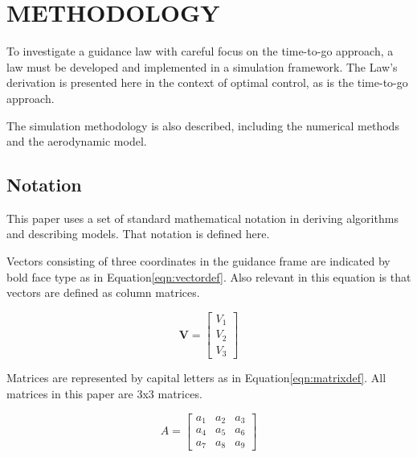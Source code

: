 \chapter{METHODOLOGY} \label{chap:methodology}
To investigate a guidance law with careful focus on the time-to-go approach, a law must be developed and implemented in a simulation framework. The Law's derivation is presented here in the context of optimal control, as is the time-to-go approach. 

The simulation methodology is also described, including the numerical methods and the aerodynamic model.

\section{Notation}
This paper uses a set of standard mathematical notation in deriving algorithms and describing models. That notation is defined here.

Vectors consisting of three coordinates in the guidance frame are indicated by bold face type as in Equation\:\ref{eqn:vectordef}. Also relevant in this equation is that vectors are defined as column matrices.

\begin{equation}
\label{eqn:vectordef}
\bm{V} = 
\begin{bmatrix}
V_1 \\
V_2 \\
V_3
\end{bmatrix}
\end{equation}

Matrices are represented by capital letters as in Equation\:\ref{eqn:matrixdef}. All matrices in this paper are 3x3 matrices.

\begin{equation}
\label{eqn:matrixdef}
A = 
\begin{bmatrix}
	a_1 & a_2 & a_3 \\
	a_4 & a_5 & a_6 \\
	a_7 & a_8 & a_9
\end{bmatrix}
\end{equation}


